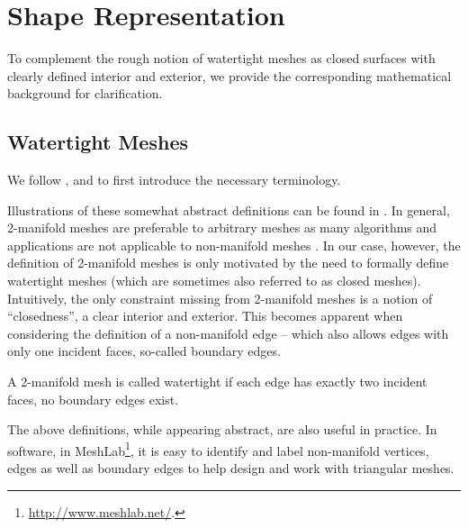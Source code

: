 \chapter{Shape Representation}
\label{ch:appendix-shape-representation}

To complement the rough notion of watertight meshes as closed surfaces with
clearly defined interior and exterior, we provide the corresponding mathematical
background for clarification.

\section{Watertight Meshes}

We follow
\cite[Section~1.3]{BotschKobbelt:2010}, \cite{Edelsbrunner:2003}
and \cite[Chapter~3]{Giblin:2010} to first introduce the necessary
terminology.

\begin{definition}
\end{definition}

Illustrations of these somewhat abstract definitions can be found in
\cite[Figure~1.6]{BotschKobbelt:2010}. In general, 2-manifold meshes are
preferable to arbitrary meshes as many
algorithms and applications are not applicable to non-manifold meshes \cite{BotschKobbelt:2010}.
In our case, however, the definition of 2-manifold meshes is only motivated by
the need to formally define watertight meshes (which are sometimes also referred
to as closed meshes).
Intuitively, the only constraint missing from 2-manifold meshes is a notion
of ``closedness'', \ie a clear interior and exterior.
This becomes apparent when considering the definition
of a non-manifold edge -- which also allows edges with only one incident faces,
so-called boundary edges. 

\begin{definition}
  A 2-manifold mesh is called watertight if each edge has exactly two incident
  faces, \ie no boundary edges exist.
\end{definition}

The above definitions, while appearing abstract, are also useful in practice.
In software, \eg in MeshLab\footnote{
  \url{http://www.meshlab.net/}.
}, it is easy to identify and label non-manifold vertices, edges as well as
boundary edges to help design and work with triangular meshes.
